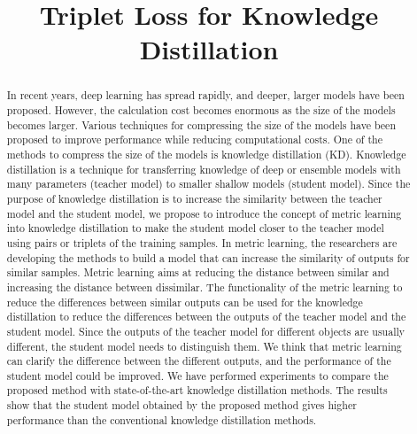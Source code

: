 \documentclass[conference]{IEEEtran}
\begin{document}
\title{Triplet Loss for Knowledge Distillation}

\author{

}

\maketitle

\begin{abstract}
In recent years, deep learning has spread rapidly, and deeper, larger models have been proposed.
However, the calculation cost becomes enormous as the size of the models becomes larger.
Various techniques for compressing the size of the models have been proposed to improve performance while reducing computational costs.
One of the methods to compress the size of the models is knowledge distillation (KD).
Knowledge distillation is a technique for transferring knowledge of deep or ensemble models with many parameters (teacher model) to smaller shallow models (student model).
Since the purpose of knowledge distillation is to increase the similarity between the teacher model and the student model, we propose to introduce the concept of metric learning into knowledge distillation to make the student model closer to the teacher model using pairs or triplets of the training samples.
In metric learning, the researchers are developing the methods to build a model that can increase the similarity of outputs for similar samples.
Metric learning aims at reducing the distance between similar and increasing the distance between dissimilar.
The functionality of the metric learning to reduce the differences between similar outputs can be used for the knowledge distillation to reduce the differences between the outputs of the teacher model and the student model.
Since the outputs of the teacher model for different objects are usually different, the student model needs to distinguish them.
We think that metric learning can clarify the difference between the different outputs, and the performance of the student model could be improved.
We have performed experiments to compare the proposed method with state-of-the-art knowledge distillation methods.
The results show that the student model obtained by the proposed method gives higher performance than the conventional knowledge distillation methods.
\end{abstract}
\end{document}
